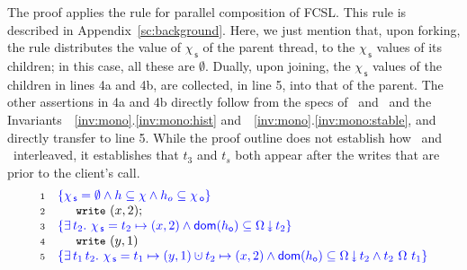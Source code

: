 \documentclass[a4paper,UKenglish]{lipics-v2016}
\newcommand{\dom}[1]{\mathsf{dom}(#1)}
\newcommand{\specK}[1]{\ensuremath{\textcolor{blue}{#1}}}
\newcommand{\dotcup}{\ensuremath{\mathaccent\cdot\cup}}
\newcommand{\esc}[1]{\text{\texttt{\small{#1}}}}
\newcommand{\selfsub}{\mathsf{s}}
\newcommand{\othersub}{\mathsf{o}}
\newcommand{\hist}{\chi}
\newcommand{\histS}{\hist_{\, \selfsub}}
\newcommand{\histO}{\hist_{\, \othersub}}
\newcommand{\hempty}{\emptyset}
\newcommand{\hunion}{\mathbin{\dotcup}}
\newcommand{\hpts}{\mapsto}
\newcommand{\ldot}{\mathord{.}\,}
\newcommand{\stableorder}{\Omega}
\newcommand{\histP}{\chi'}
\newcommand{\num}[1]{{\text{{\scriptsize{#1}}}}}
\theoremstyle{definition}
\begin{document}
The proof applies the rule for parallel composition of FCSL. This rule
is described in Appendix~\ref{sc:background}. Here, we just mention
that, upon forking, the rule distributes the value of $\histS$ of the
parent thread, to the $\histS$ values of its children; in this case,
all these are $\hempty$. Dually, upon joining, the $\histS$ values of
the children in lines 4a and 4b, are collected, in line 5, into that
of the parent. The other assertions in 4a and 4b directly follow from
the specs of \jyscan\ and \jywrite\ and the
Invariants~~\ref{inv:mono}.\ref{inv:mono:hist}
and~~\ref{inv:mono}.\ref{inv:mono:stable}, and directly transfer to
line 5.
%
While the proof outline does not establish how
\jyscan\ and \jywrite\ interleaved, it establishes that $t_3$ and $t_s$
both appear after the writes that are prior to the client's call.
{
\[
\begin{array}{r l}
  \num{1} & \specK{\{ \histS = \hempty \wedge h \subseteq \hist \wedge
    h_o \subseteq \histO \}} \\ %
  \num{2} & \esc{write}~(x,2);\\
  \num{3} & \specK{\{ \exists\, t_2 \ldot\, \histS = t_2 \hpts (x,2) \wedge \dom{h_{\othersub}} \subseteq \sideal{\stableorder}{t_2} \}} \\
  \num{4} & \esc{write}~(y,1)\\
  \num{5} & \specK{\{ \exists\, t_1\, t_2\ldot\, 
    \histS = t_1 \hpts (y,1) \hunion t_2 \hpts (x,2) \wedge %
    \dom{h_{\othersub}} \subseteq \sideal{\stableorder}{t_2} \wedge 
    t_2\ {\stableorder}\ t_1\}}
\end{array}
\]}
\end{document}

